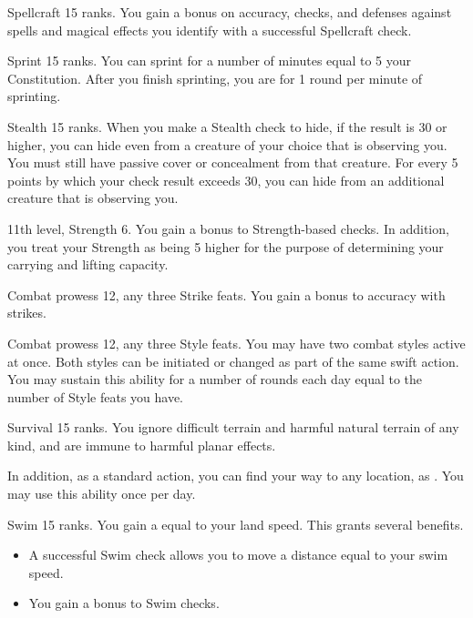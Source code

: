 \featpre Spellcraft 15 ranks.
\featben You gain a  bonus on accuracy, checks, and defenses against spells and magical effects you identify with a successful Spellcraft check.

\featpre Sprint 15 ranks.
\featben You can sprint for a number of minutes equal to 5 \add your Constitution.
After you finish sprinting, you are \fatigued for 1 round per minute of sprinting.

\featpre Stealth 15 ranks.
\featben When you make a Stealth check to hide, if the result is 30 or higher, you can hide even from a creature of your choice that is observing you.
You must still have passive cover or concealment from that creature.
For every 5 points by which your check result exceeds 30, you can hide from an additional creature that is observing you.

\featpres 11th level, Strength 6.
\featben You gain a  bonus to Strength-based checks.
In addition, you treat your Strength as being 5 higher for the purpose of determining your carrying and lifting capacity.

\featpres Combat prowess 12, any three Strike feats.
\featben You gain a  bonus to accuracy with strikes.

\featpres Combat prowess 12, any three Style feats.
\featben You may have two combat styles active at once.
Both styles can be initiated or changed as part of the same swift action.
You may sustain this ability for a number of rounds each day equal to the number of Style feats you have.

\featpre Survival 15 ranks.
\featben You ignore difficult terrain and harmful natural terrain of any kind, and are immune to harmful planar effects.

In addition, as a standard action, you can find your way to any location, as .
You may use this ability once per day.

\featpre Swim 15 ranks.
\featben You gain a  equal to your land speed.
This grants several benefits.
\begin{itemize}
    \item A successful Swim check allows you to move a distance equal to your swim speed.
    \item You gain a  bonus to Swim checks.
\end{itemize}

